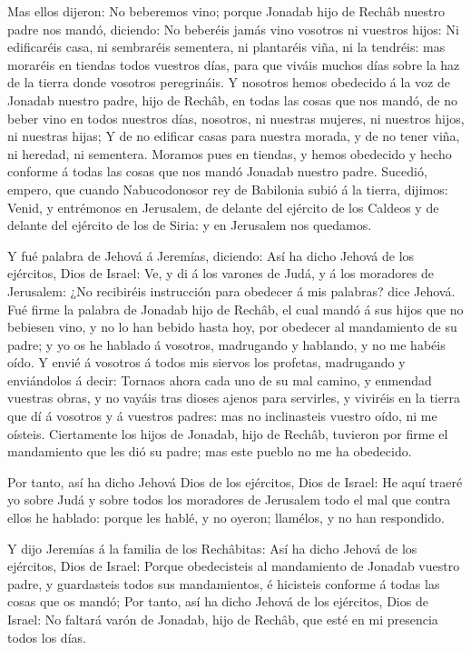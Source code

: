  Mas ellos dijeron: No beberemos vino; porque Jonadab hijo
de Rechâb nuestro padre nos mandó, diciendo: No beberéis jamás vino
vosotros ni vuestros hijos:  Ni edificaréis casa, ni
sembraréis sementera, ni plantaréis viña, ni la tendréis: mas moraréis
en tiendas todos vuestros días, para que viváis muchos días sobre la haz
de la tierra donde vosotros peregrináis.  Y nosotros hemos
obedecido á la voz de Jonadab nuestro padre, hijo de Rechâb, en todas
las cosas que nos mandó, de no beber vino en todos nuestros días,
nosotros, ni nuestras mujeres, ni nuestros hijos, ni nuestras hijas;
 Y de no edificar casas para nuestra morada, y de no tener
viña, ni heredad, ni sementera.  Moramos pues en tiendas, y
hemos obedecido y hecho conforme á todas las cosas que nos mandó Jonadab
nuestro padre.  Sucedió, empero, que cuando Nabucodonosor
rey de Babilonia subió á la tierra, dijimos: Venid, y entrémonos en
Jerusalem, de delante del ejército de los Caldeos y de delante del
ejército de los de Siria: y en Jerusalem nos quedamos.

 Y fué palabra de Jehová á Jeremías, diciendo:
 Así ha dicho Jehová de los ejércitos, Dios de Israel: Ve,
y di á los varones de Judá, y á los moradores de Jerusalem: ¿No
recibiréis instrucción para obedecer á mis palabras? dice Jehová.
 Fué firme la palabra de Jonadab hijo de Rechâb, el cual
mandó á sus hijos que no bebiesen vino, y no lo han bebido hasta hoy,
por obedecer al mandamiento de su padre; y yo os he hablado á vosotros,
madrugando y hablando, y no me habéis oído.  Y envié á
vosotros á todos mis siervos los profetas, madrugando y enviándolos á
decir: Tornaos ahora cada uno de su mal camino, y enmendad vuestras
obras, y no vayáis tras dioses ajenos para servirles, y viviréis en la
tierra que dí á vosotros y á vuestros padres: mas no inclinasteis
vuestro oído, ni me oísteis.  Ciertamente los hijos de
Jonadab, hijo de Rechâb, tuvieron por firme el mandamiento que les dió
su padre; mas este pueblo no me ha obedecido.

 Por tanto, así ha dicho Jehová Dios de los ejércitos, Dios
de Israel: He aquí traeré yo sobre Judá y sobre todos los moradores de
Jerusalem todo el mal que contra ellos he hablado: porque les hablé, y
no oyeron; llamélos, y no han respondido.

 Y dijo Jeremías á la familia de los Rechâbitas: Así ha
dicho Jehová de los ejércitos, Dios de Israel: Porque obedecisteis al
mandamiento de Jonadab vuestro padre, y guardasteis todos sus
mandamientos, é hicisteis conforme á todas las cosas que os mandó;
 Por tanto, así ha dicho Jehová de los ejércitos, Dios de
Israel: No faltará varón de Jonadab, hijo de Rechâb, que esté en mi
presencia todos los días.

